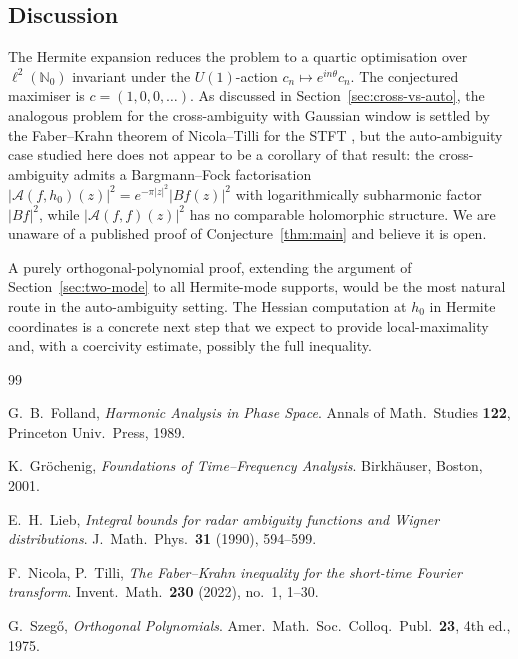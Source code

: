 \documentclass[11pt]{article}
\theoremstyle{definition}
\newcommand{\N}{\mathbb{N}}
\newcommand{\Amb}{\mathcal{A}}
\begin{document}
\subsection{Discussion}

The Hermite expansion reduces the problem to a quartic optimisation over
$\ell^{2}(\N_{0})$ invariant under the $U(1)$-action $c_{n}\mapsto
e^{in\theta}c_{n}$.  The conjectured maximiser is $c=(1,0,0,\dots)$.  As
discussed in Section~\ref{sec:cross-vs-auto}, the analogous problem for
the cross-ambiguity with Gaussian window is settled by the Faber--Krahn
theorem of Nicola--Tilli for the STFT \cite{NicolaTilli2022STFT}, but the
auto-ambiguity case studied here does not appear to be a corollary of that
result: the cross-ambiguity admits a Bargmann--Fock factorisation
$|\Amb(f,h_{0})(z)|^{2}=e^{-\pi|z|^{2}}|Bf(z)|^{2}$ with logarithmically
subharmonic factor $|Bf|^{2}$, while $|\Amb(f,f)(z)|^{2}$ has no comparable
holomorphic structure.  We are unaware of a published proof of
Conjecture~\ref{thm:main} and believe it is open.

A purely orthogonal-polynomial proof, extending the argument of
Section~\ref{sec:two-mode} to all Hermite-mode supports, would be the
most natural route in the auto-ambiguity setting.  The Hessian
computation at $h_{0}$ in Hermite coordinates is a concrete next step
that we expect to provide local-maximality and, with a coercivity
estimate, possibly the full inequality.

\begin{thebibliography}{99}

 G.~B.~Folland, \emph{Harmonic Analysis in Phase Space}.
Annals of Math.\ Studies \textbf{122}, Princeton Univ.\ Press, 1989.

 K.~Gr\"ochenig, \emph{Foundations of Time--Frequency
Analysis}.  Birkh\"auser, Boston, 2001.

 E.~H.~Lieb, \emph{Integral bounds for radar ambiguity
functions and Wigner distributions}.  J.~Math.\ Phys.\ \textbf{31} (1990),
594--599.

 F.~Nicola, P.~Tilli, \emph{The Faber--Krahn
inequality for the short-time Fourier transform}.  Invent.\ Math.\
\textbf{230} (2022), no.~1, 1--30.

 G.~Szeg\H{o}, \emph{Orthogonal Polynomials}.  Amer.\ Math.\
Soc.\ Colloq.\ Publ.\ \textbf{23}, 4th ed., 1975.

\end{thebibliography}
\end{document}

